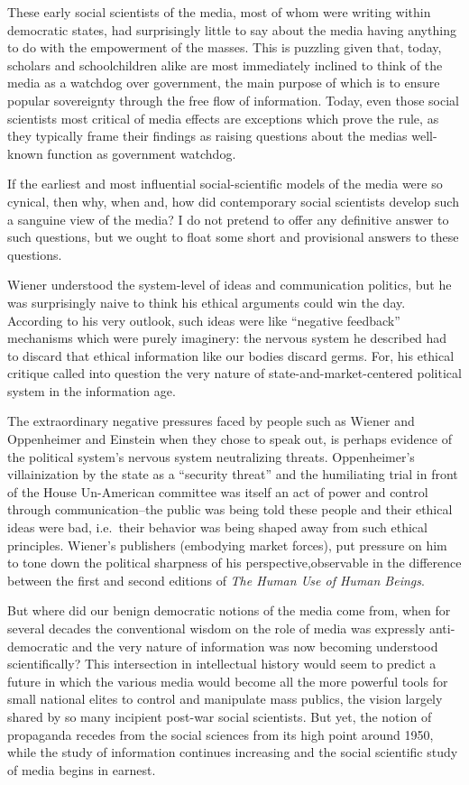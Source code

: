 \documentclass[12pt,book]{article}
\begin{document}
These early social scientists of the media, most of whom were writing
within democratic states, had surprisingly little to say about the media
having anything to do with the empowerment of the masses. This is
puzzling given that, today, scholars and schoolchildren alike are most
immediately inclined to think of the media as a watchdog over
government, the main purpose of which is to ensure popular sovereignty
through the free flow of information. Today, even those social
scientists most critical of media effects are exceptions which prove the
rule, as they typically frame their findings as raising questions about
the medias well-known function as government watchdog.

If the earliest and most influential social-scientific models of the
media were so cynical, then why, when and, how did contemporary social
scientists develop such a sanguine view of the media? I do not pretend
to offer any definitive answer to such questions, but we ought to float
some short and provisional answers to these questions.

Wiener understood the system-level of ideas and communication politics,
but he was surprisingly naive to think his ethical arguments could win
the day. According to his very outlook, such ideas were like ``negative
feedback'' mechanisms which were purely imaginery: the nervous system he
described had to discard that ethical information like our bodies
discard germs. For, his ethical critique called into question the very
nature of state-and-market-centered political system in the information
age.

The extraordinary negative pressures faced by people such as Wiener and
Oppenheimer and Einstein when they chose to speak out, is perhaps
evidence of the political system's nervous system neutralizing threats.
Oppenheimer's villainization by the state as a ``security threat'' and
the humiliating trial in front of the House Un-American committee was
itself an act of power and control through communication--the public was
being told these people and their ethical ideas were bad, i.e.~their
behavior was being shaped away from such ethical principles. Wiener's
publishers (embodying market forces), put pressure on him to tone down
the political sharpness of his perspective,observable in the difference
between the first and second editions of \emph{The Human Use of Human
Beings}.

But where did our benign democratic notions of the media come from, when
for several decades the conventional wisdom on the role of media was
expressly anti-democratic and the very nature of information was now
becoming understood scientifically? This intersection in intellectual
history would seem to predict a future in which the various media would
become all the more powerful tools for small national elites to control
and manipulate mass publics, the vision largely shared by so many
incipient post-war social scientists. But yet, the notion of propaganda
recedes from the social sciences from its high point around 1950, while
the study of information continues increasing and the social scientific
study of media begins in earnest.
\end{document}
